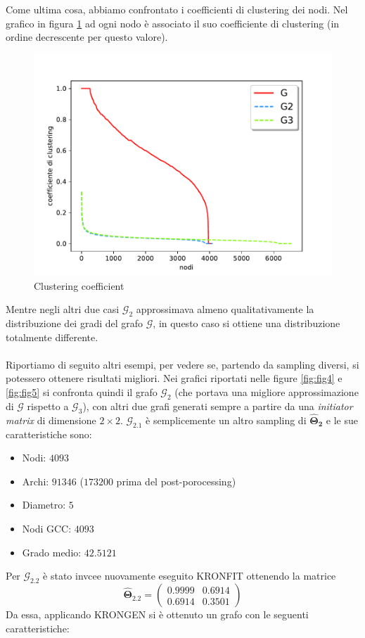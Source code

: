 \documentclass[12pt]{scrartcl}
\begin{document}
Come ultima cosa, abbiamo confrontato i coefficienti di clustering dei nodi. Nel grafico in figura \ref{fig:fig3} ad ogni nodo è associato il suo coefficiente di clustering (in ordine decrescente per questo valore).

\begin{figure}[H]
	\centering
	\includegraphics[width=0.7\linewidth]{imgs/Figure_3.pdf}
	\caption{Clustering coefficient}\label{fig:fig3}
\end{figure}

Mentre negli altri due casi $\mathcal{G}_2$ approssimava almeno qualitativamente la distribuzione dei gradi del grafo $\mathcal{G}$, in questo caso si ottiene una distribuzione totalmente differente.\\~\\
Riportiamo di seguito altri esempi, per vedere se, partendo da sampling diversi, si potessero ottenere risultati migliori. Nei grafici riportati nelle figure \ref{fig:fig4} e \ref{fig:fig5} si confronta quindi il grafo $\mathcal{G}_2$ (che portava una migliore approssimazione di $\mathcal{G}$ rispetto a $\mathcal{G}_3$), con altri due grafi generati sempre a partire da una \textit{initiator matrix} di dimensione $2\times2$. $\mathcal{G}_{2.1}$ è semplicemente un altro sampling di $\mathbf{\hat{\Theta}_2}$ e le sue caratteristiche sono:
\begin{itemize}
	\item Nodi: $4093$ 
	\item Archi: $91346$ ($173200$ prima del post-porocessing)
	\item Diametro: $5$
	\item Nodi GCC: $4093$
	\item Grado medio: $42.5121$
\end{itemize}
 
Per $\mathcal{G}_{2.2}$ è stato invcee nuovamente eseguito \textsf{KRONFIT} ottenendo la matrice
\[
	\mathbf{\hat{\Theta}_{2.2}} =
	\begin{pmatrix}
	0.9999 & 0.6914 \\
	0.6914 & 0.3501 
	\end{pmatrix} 
\]
Da essa, applicando \textsf{KRONGEN} si è ottenuto un grafo con le seguenti caratteristiche:
\end{document}
